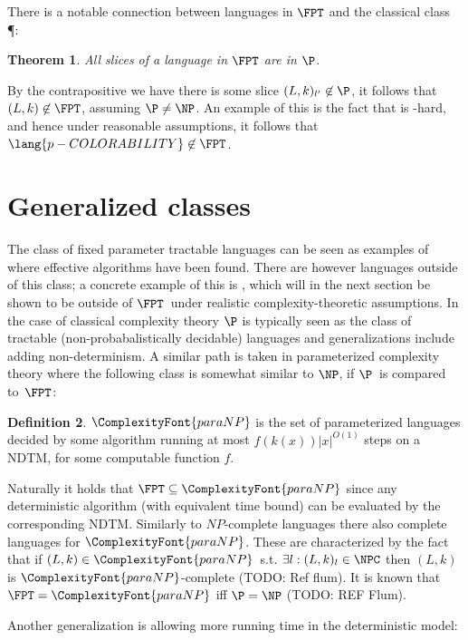 \documentclass[a4paper,11pt,notitlepage]{report}
\theoremstyle{plain}
\newtheorem{thm}{Theorem}[chapter] %
\theoremstyle{definition}
\newtheorem{defn}[thm]{Definition} %
\newcommand{\PARANP}{\ComplexityFont{paraNP}}
\begin{document}
There is a notable connection between languages in $\FPT$ and the classical class \P:

\begin{thm}
All slices of a language in $\FPT$ are in $\P$.
\end{thm}

By the contrapositive we have there is some slice $(L, k)_{l'} \not \in \P$, it follows that $(L, k) \not \in \FPT$, assuming $\P \not = \NP$.
An example of this is the fact that  is \NP-hard, and hence under reasonable assumptions, it follows that $\lang{p-COLORABILITY} \not \in \FPT$.

\section{Generalized classes}
The class of fixed parameter tractable languages can be seen as examples of where effective algorithms have been found.
There are however languages outside of this class; a concrete example of this is , which will in the next section be shown to be outside of $\FPT$ under realistic complexity-theoretic assumptions.
In the case of classical complexity theory $\P$ is typically seen as the class of tractable (non-probabalistically decidable) languages and generalizations include adding non-determinism.
A similar path is taken in parameterized complexity theory where the following class is somewhat similar to $\NP$, if $\P$ is compared to $\FPT$:

\begin{defn}
$\PARANP$ is the set of parameterized languages decided by some algorithm running at most $f(k(x)) |x|^{O(1)}$ steps on a NDTM, for some computable function $f$.
\end{defn}

Naturally it holds that $\FPT \subseteq \PARANP$ since any deterministic algorithm (with equivalent time bound) can be evaluated by the corresponding NDTM.
Similarly to $NP$-complete languages there also complete languages for $\PARANP$.
These are characterized by the fact that if $(L, k) \in \PARANP$ s.t. $\exists l : (L, k)_l \in \NPC$ then $(L, k)$ is $\PARANP$-complete (TODO: Ref flum).
It is known that $\FPT = \PARANP$ iff $\P = \NP$ (TODO: REF Flum).

Another generalization is allowing more running time in the deterministic model:
\end{document}
